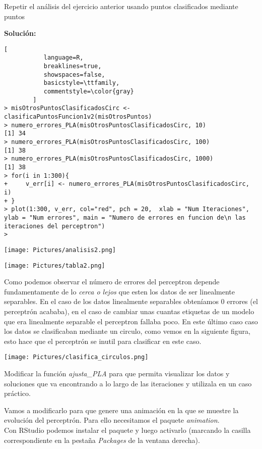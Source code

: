\documentclass[11pt,fleqn]{book} %
\begin{document}
\begin{exercise}
Repetir el análisis del ejercicio anterior usando puntos clasificados mediante puntos
\end{exercise}
\textbf{Solución:}
\begin{lstlisting}[
           language=R,
           breaklines=true,
           showspaces=false,
           basicstyle=\ttfamily,
           commentstyle=\color{gray}
        ]
> misOtrosPuntosClasificadosCirc <- clasificaPuntosFuncion1v2(misOtrosPuntos)
> numero_errores_PLA(misOtrosPuntosClasificadosCirc, 10)
[1] 34
> numero_errores_PLA(misOtrosPuntosClasificadosCirc, 100)
[1] 38
> numero_errores_PLA(misOtrosPuntosClasificadosCirc, 1000)
[1] 38
> for(i in 1:300){
+     v_err[i] <- numero_errores_PLA(misOtrosPuntosClasificadosCirc, i)
+ }
> plot(1:300, v_err, col="red", pch = 20,  xlab = "Num Iteraciones", ylab = "Num errores", main = "Numero de errores en funcion de\n las iteraciones del perceptron")
>   
\end{lstlisting}

\begin{multicols}{2} 
\texttt{[image: Pictures/analisis2.png]}

\;

\;

\;

\begin{center}
\texttt{[image: Pictures/tabla2.png]}
\end{center}
\end{multicols} 
Como podemos observar el número de errores del perceptron depende fundamentamente de lo \textit{cerca o lejos} que esten los datos de ser linealmente separables. En el caso de los datos linealmente separables obteníamos 0 errores (el perceptrón acababa), en el caso de cambiar unas cuantas etiquetas de un modelo que era linealmente separable el perceptron fallaba poco. En este último caso caso los datos se clasificaban mediante un circulo, como vemos en la siguiente figura, esto hace que el perceptrón se inutil para clasificar en este caso.

\texttt{[image: Pictures/clasifica\_circulos.png]}

\begin{exercise}
Modificar la función \textit{ajusta\_PLA} para que permita visualizar los datos y soluciones que va encontrando a lo largo de las iteraciones y utilizala en un caso práctico.
\end{exercise}

Vamos a modificarlo para que genere una animación en la que se muestre la evolución del perceptrón.
Para ello necesitamos el paquete \textit{animation}.\\
Con RStudio podemos instalar el paquete y luego activarlo (marcando la casilla correspondiente en la pestaña \textit{Packages} de la ventana derecha).
\end{document}
